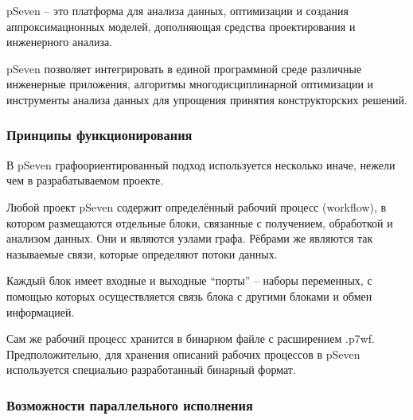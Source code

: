 \def\notedate{2021.11.06}
\def\currentauthor{Тришин И.В. (РК6)}%

\textsf{pSeven} -- это платформа для анализа данных, оптимизации и создания аппроксимационных моделей, дополняющая средства проектирования и инженерного анализа. 

\textsf{pSeven} позволяет интегрировать в единой программной среде различные инженерные приложения, алгоритмы многодисциплинарной оптимизации и инструменты анализа данных для упрощения принятия конструкторских решений\cite{DatadvanceOffWebsite2021}.

\subsubsection{Принципы функционирования}

В \textsf{pSeven} графоориентированный подход используется несколько иначе, нежели чем в разрабатываемом проекте.


Любой проект \textsf{pSeven} содержит определённый рабочий процесс (workflow), в котором размещаются отдельные блоки, связанные с получением,
обработкой и анализом данных. Они и являются узлами графа. Рёбрами же являются так называемые связи, которые определяют потоки данных.

Каждый блок имеет входные и выходные ``порты'' -- наборы переменных, с помощью которых осуществляется связь блока с другими блоками и обмен информацией\cite{pSevenDocs2021}.

Сам же рабочий процесс хранится в бинарном файле с расширением \textsf{.p7wf}. Предположительно, для хранения описаний рабочих процессов
в \textsf{pSeven} используется специально разработанный бинарный формат.

\subsubsection{Возможности параллельного исполнения}


